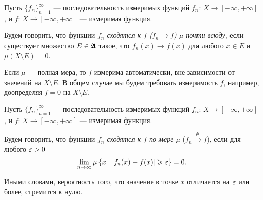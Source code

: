 \begin{df}
 Пусть $\{f_{n}\}_{n=1}^{\infty} $ --- последовательность измеримых функций $f_n \colon\, X \to [-\infty, +\infty]  $, и $f \colon\, X \to [-\infty, +\infty] $ --- измеримая функция.

 Будем говорить, что функции \textit{$f_n$ сходятся к $f$ ($f_n \to f$) $\mu$-почти всюду}, если существует множество  $E \in \mathfrak{A}$ такое, что $f_n(x) \to f(x)$ для любого $x \in E$ и $\mu(X \setminus E) = 0$.
\end{df}
\begin{remrk*}
 Если $\mu$ --- полная мера, то $f$ измерима автоматически, вне зависимости от значений на $X \setminus E$. В общем случае мы будем требовать измеримость $f$, например, доопределяя $f = 0$ на $X \setminus E$.
\end{remrk*}
\begin{df}
 Пусть $\{f_{n}\}_{n=1}^{\infty} $ --- последовательность измеримых функций $f_n \colon\, X \to [-\infty, +\infty]  $, и $f \colon\, X \to [-\infty, +\infty] $ --- измеримая функция.

 Будем говорить, что функции \textit{$f_n$ сходятся к $f$ по мере $\mu$} ($f_n \xrightarrow{\mu} f$), если для любого $\varepsilon > 0$
 \begin{align*}
  \lim_{n \to \infty} \mu \left\{ x \mid \left| f_n(x) - f(x) \right| \geqslant \varepsilon \right\}  = 0
 .\end{align*} 

 Иными словами, вероятность того, что значение в точке $x$ отличается на $\varepsilon$ или более, стремится к нулю.
\end{df}

